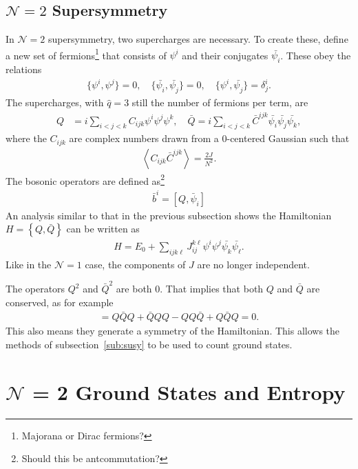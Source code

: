 \documentclass[12pt]{article} %
\renewcommand{\cal}{\mathcal}
\newcommand{\ex}[1]{\left\langle #1 \right\rangle}
\renewcommand{\l}{\ell}
\newcommand{\comm}[2]{\left[#1,#2\right]}
\newcommand{\acom}[2]{\left\{#1,#2\right\}}
\begin{document}
\subsection{$\cal{N}=2$ Supersymmetry}\emph{} \label{sub:N2susy}

In $\cal N=2$ supersymmetry, two supercharges are necessary. To create these, define a new set of fermions\footnote{Majorana or Dirac fermions?} that consists of $\psi^i$ and their conjugates $\bar{\psi_i}$. These obey the relations 
\begin{align}
\{\psi^i,\psi^j\} = 0, \quad \{\bar{\psi_i},\bar{\psi_j}\} = 0, \quad
	\{\psi^i,\bar{\psi_j}\} = \delta_j^i. \label{eqn:N2_ant}
\end{align}
The supercharges, with $\hat{q}=3$ still the number of fermions per term, are
\begin{align}
Q &= i\sum_{i<j<k}C_{ijk}\psi^i\psi^j\psi^k,\quad
\bar{Q} = i\sum_{i<j<k}\bar C^{ijk}\bar{\psi_i}\bar{\psi_j}\bar{\psi_k},
	\label{eqn:N2charge}
\end{align}
where the $C_{ijk}$ are complex numbers drawn from a 0-centered Gaussian such that
\begin{align}
\ex{C_{ijk}\bar C^{ijk}} = \frac{2J}{N^2}.
\end{align} 
The bosonic operators are defined as\footnote{Should this be antcommutation?}
\begin{align}
\bar{b}^i = \comm{Q}{\bar{\psi}_i}
\end{align}
An analysis similar to that in the previous subsection shows the Hamiltonian $H = \acom{Q}{\bar{Q}}$ can be written as
\begin{align}
H = E_0 + \sum_{ijk\l}J_{ij}^{k\l}\psi^i\psi^j\bar{\psi_k}\bar{\psi_\l}.
\end{align}
Like in the $\cal N=1$ case, the components of $J$ are no longer independent. 

The operators $Q^2$ and $\bar Q^2$ are both 0. That implies that both $Q$ and $\bar Q$ are conserved, as for example
\begin{align}
[H,Q] = Q\bar QQ + \bar QQQ - QQ\bar Q + Q\bar QQ = 0.
\end{align}
This also means they generate a symmetry of the Hamiltonian. This allows the methods of subsection~\ref{sub:susy} to be used to count ground states.

\section{$\cal{N}$ = 2 Ground States and Entropy} \label{sec:N2gs_ent}
\end{document}
